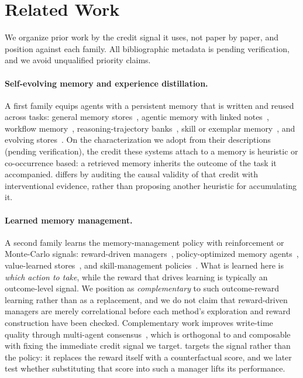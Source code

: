 \section{Related Work}

We organize prior work by the credit signal it uses, not paper by paper, and
position \method{} against each family. All bibliographic metadata is pending
verification, and we avoid unqualified priority claims.

\paragraph{Self-evolving memory and experience distillation.}
A first family equips agents with a persistent memory that is written and reused
across tasks: general memory stores~, agentic memory with
linked notes~, workflow memory~,
reasoning-trajectory banks~, skill or exemplar
memory~, and evolving stores~. On the
characterization we adopt from their descriptions (pending verification), the
credit these systems attach to a memory is heuristic or co-occurrence based: a
retrieved memory inherits the outcome of the task it accompanied. \method{}
differs by auditing the causal validity of that credit with interventional
evidence, rather than proposing another heuristic for accumulating it.

\paragraph{Learned memory management.}
A second family learns the memory-management policy with reinforcement or
Monte-Carlo signals: reward-driven managers~,
policy-optimized memory agents~, value-learned
stores~, and skill-management policies~.
What is learned here is \emph{which action to take}, while the reward that drives
learning is typically an outcome-level signal. We position \method{} as
\emph{complementary} to such outcome-reward learning rather than as a replacement,
and we do not claim that reward-driven managers are merely correlational before each
method's exploration and reward construction have been checked. Complementary work
improves write-time quality through multi-agent
consensus~, which is orthogonal to and composable with fixing the
immediate credit signal we target. \method{} targets the signal rather than the
policy: it replaces the reward itself with a counterfactual score, and we later test
whether substituting that score into such a manager lifts its performance.


